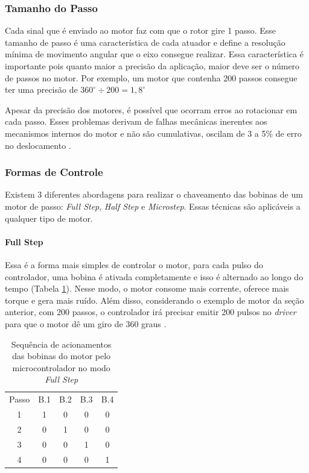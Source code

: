 \subsubsection{Tamanho do Passo}
Cada sinal que é enviado ao motor faz com que o rotor gire 1 passo. Esse tamanho de passo é uma característica de cada atuador e define a resolução mínima de movimento angular que o eixo consegue realizar. Essa característica é importante pois quanto maior a precisão da aplicação, maior deve ser o número de passos no motor. Por exemplo, um motor que contenha 200 passos consegue ter uma precisão de $ 360^{\circ} \div 200 = 1,8 ^{\circ} $

Apesar da precisão dos motores, é possível que ocorram erros ao rotacionar em cada passo. Esses problemas derivam de falhas mecânicas inerentes aos mecanismos internos do motor e não são cumulativas, oscilam de 3 a 5\% de erro no deslocamento \cite{man:advancedmicrosystemStepControl}.

\subsubsection{Formas de Controle}
Existem 3 diferentes abordagens para realizar o chaveamento das bobinas de um motor de passo: \textit{Full Step}, \textit{Half Step} e \textit{Microstep}. Essas técnicas são aplicáveis a qualquer tipo de motor.

\paragraph{Full Step}
Essa é a forma mais simples de controlar o motor, para cada pulso do controlador, uma bobina é ativada completamente e isso é alternado ao longo do tempo (Tabela \ref{tab:fs}). Nesse modo, o motor consome mais corrente, oferece mais torque e gera mais ruído. Além disso, considerando o exemplo de motor da seção anterior, com 200 passos, o controlador irá precisar emitir 200 pulsos no \textit{driver} para que o motor dê um giro de 360 graus \cite{man:advancedmicrosystemStepControl}.

\begin{table}[!htb]
	\centering
	\begin{tabular}{c|c|c|c|c}
		Passo & B.1 & B.2 & B.3 & B.4 \\
		1	& 1 & 0 & 0 & 0\\
		2	& 0 & 1 & 0 & 0\\
		3	& 0 & 0 & 1 & 0\\
		4	& 0 & 0	& 0 & 1		\\
	\end{tabular}
\caption{Sequência de acionamentos das bobinas do motor pelo microcontrolador no modo \textit{Full Step}}
	\label{tab:fs}
\end{table}


